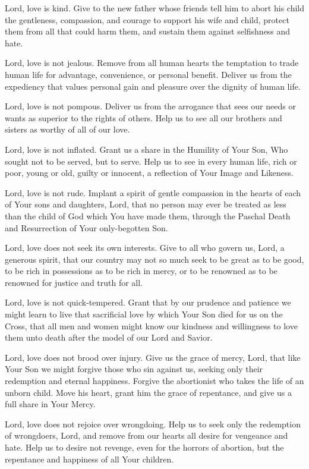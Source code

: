 Lord, love is kind.
Give to the new father whose friends tell him to abort his child the gentleness, compassion, and courage to support his wife and child, protect them from all that could harm them, and sustain them against selfishness and hate.

Lord, love is not jealous.
Remove from all human hearts the temptation to trade human life for advantage, convenience, or personal benefit.
Deliver us from the expediency that values personal gain and pleasure over the dignity of human life.

Lord, love is not pompous.
Deliver us from the arrogance that sees our needs or wants as superior to the rights of others.
Help us to see all our brothers and sisters as worthy of all of our love.

Lord, love is not inflated.
Grant us a share in the Humility of Your Son, Who sought not to be served, but to serve. Help us to see in every human life, rich or poor, young or old, guilty or innocent, a reflection of Your Image and Likeness. 

Lord, love is not rude.
Implant a spirit of gentle compassion in the hearts of each of Your sons and daughters, Lord, that no person may ever be treated as less than the child of God which You have made them, through the Paschal Death and Resurrection of Your only-begotten Son.

Lord, love does not seek its own interests.
Give to all who govern us, Lord, a generous spirit, that our country may not so much seek to be great as to be good, to be rich in possessions as to be rich in mercy, or to be renowned as to be renowned for justice and truth for all.

Lord, love is not quick-tempered.
Grant that by our prudence and patience we might learn to live that sacrificial love by which Your Son died for us on the Cross, that all men and women might know our kindness and willingness to love them unto death after the model of our Lord and Savior.

Lord, love does not brood over injury.
Give us the grace of mercy, Lord, that like Your Son we might forgive those who sin against us, seeking only their redemption and eternal happiness.
Forgive the abortionist who takes the life of an unborn child.
Move his heart, grant him the grace of repentance, and give us a full share in Your Mercy.

Lord, love does not rejoice over wrongdoing.
Help us to seek only the redemption of wrongdoers, Lord, and remove from our hearts all desire for vengeance and hate.
Help us to desire not revenge, even for the horrors of abortion, but the repentance and happiness of all Your children.

